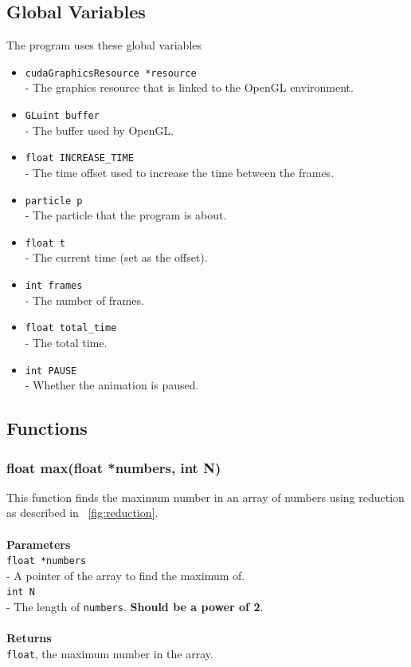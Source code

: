 \documentclass[a4paper, 10pt]{article}
\def\mar{\hspace*{5mm}}
\begin{document}
    \vspace{1cm}
    \subsection{Global Variables}
    The program uses these global variables
    \begin{itemize}
        \item \verb|cudaGraphicsResource *resource|\\\mar- The graphics resource that is
              linked to the OpenGL environment.
        \item \verb|GLuint buffer|\\\mar- The buffer used by OpenGL.
        \item \verb|float INCREASE_TIME|\\\mar- The time offset used to increase the time
              between the frames.
        \item \verb|particle p|\\\mar- The particle that the program is about.
        \item \verb|float t|\\\mar- The current time (set as the offset).
        \item \verb|int frames|\\\mar- The number of frames.
        \item \verb|float total_time|\\\mar- The total time.
        \item \verb|int PAUSE|\\\mar- Whether the animation is paused.
    \end{itemize}

    \newpage
    \subsection{Functions}
        \vspace{1cm}
        \subsubsection{float max(float *numbers, int N)}
        This function finds the maximum number in an array of numbers using reduction
        as described in ~\ref{fig:reduction}.\\
        \\{\bf Parameters}\\
        \verb|float *numbers|\\\mar- A pointer of the array to find the maximum of.\\
        \verb|int N|\\\mar- The length of \verb|numbers|. {\bf Should be a power of 2}.\\
        \\{\bf Returns}\\
        \verb|float|, the maximum number in the array.
\end{document}
